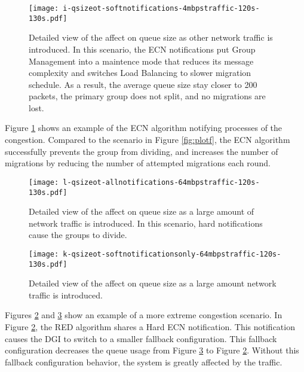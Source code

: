 \begin{figure}
\texttt{[image: i-qsizeot-softnotifications-4mbpstraffic-120s-130s.pdf]}
\caption{Detailed view of the affect on queue size as other network traffic is introduced. In this scenario, the ECN notifications put Group Management into a maintence mode that reduces its message complexity and switches Load Balancing to slower migration schedule. As a result, the average queue size stay closer to 200 packets, the primary group does not split, and no migrations are lost.}
\label{fig:ploti}
\end{figure}

Figure \ref{fig:ploti} shows an example of the \ac{ECN} algorithm notifying processes of the congestion.
Compared to the scenario in Figure \ref{fig:plotf}, the \ac{ECN} algorithm successfully prevents the group from dividing, and increases the number of migrations by reducing the number of attempted migrations each round.

\begin{figure}
\texttt{[image: l-qsizeot-allnotifications-64mbpstraffic-120s-130s.pdf]}
\caption{Detailed view of the affect on queue size as a large amount of network traffic is introduced. In this scenario, hard notifications cause the groups to divide. }
\label{fig:plotl}
\end{figure}

\begin{figure}
\texttt{[image: k-qsizeot-softnotificationsonly-64mbpstraffic-120s-130s.pdf]}
\caption{Detailed view of the affect on queue size as a large amount network traffic is introduced.}
\label{fig:plotk}
\end{figure}

Figures \ref{fig:plotl} and \ref{fig:plotk} show an example of a more extreme congestion scenario.
In Figure \ref{fig:plotl}, the \ac{RED} algorithm shares a Hard \ac{ECN} notification.
This notification causes the \ac{DGI} to switch to a smaller fallback configuration.
This fallback configuration decreases the queue usage from Figure \ref{fig:plotk} to Figure \ref{fig:plotl}.
Without this fallback configuration behavior, the system is greatly affected by the traffic.

